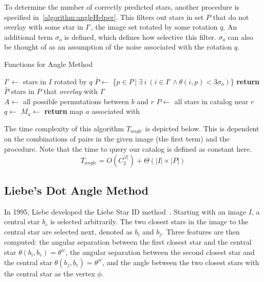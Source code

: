 To determine the number of correctly predicted stars, another procedure is specified in~\autoref{algorithm:angleHelper}.
This filters out stars in set $P$ that do not overlay with some star in $I'$, the image set rotated by some rotation
$q$.
An additional term $\sigma_o$ is defined, which defines how selective this filter.
$\sigma_o$ can also be thought of as an assumption of the noise associated with the rotation $q$.

\begin{algorithm}
    \caption{Functions for Angle Method}\label{algorithm:angleHelper}
    \begin{algorithmic}[1]
        \State $I' \gets$ stars in $I$ rotated by $q$
        \State $\bar{P} \gets $ \{$p \in P \ | \ \exists \ i \ (i \in I' \land \theta (i, p) < 3\sigma_o)$\}
        \State \textbf{return} $\bar{P}$ \Comment stars in $P$ that \textit{overlay} with $I'$
        \EndFunction
        \\
        \State $A \gets $ all possible permutations between $b$ and $r$
        \State $P \gets $ all stars in catalog near $r$
        \\
        \State $q \gets $ 
        \State $M_a \gets $ 
        \EndFor
        \State \textbf{return} map $a$ associated with 
        \EndFunction
    \end{algorithmic}
\end{algorithm}

The time complexity of this algorithm $T_{angle}$ is depicted below.
This is dependent on the combinations of pairs in the given image (the first term) and the  procedure.
Note that the time to query our catalog is defined as constant here.
\begin{equation}\label{eq:complexityAngle}
    T_{angle} = O\left( C^{|I|}_2 \right) + \Theta \left( |I| \times |P| \right)
\end{equation}

\subsection{Liebe's Dot Angle Method}\label{subsec:liebe'sDotAngleMethod}
In 1995, Liebe developed the Liebe Star ID method~\cite{Survey,AnalysisUncompensated}.
Starting with an image $I$, a central star $b_c$ is selected arbitrarily.
The two closest stars in the image to the central star are selected next, denoted as $b_i$ and $b_j$.
Three features are then computed: the angular separation between the first closest star and the central star $\theta
(b_i, b_c) = \theta^{ic}$, the angular separation between the second closest star and the central star $\theta (b_j,
b_c) = \theta^{jc}$, and the angle between the two closest stars with the central star as the vertex $\phi$.

